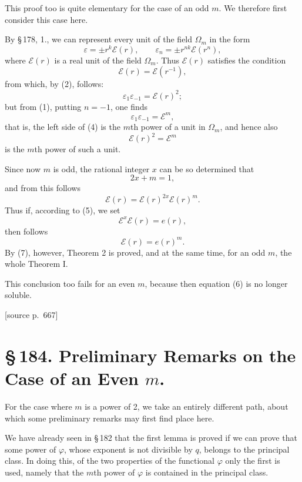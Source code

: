 \documentclass[11pt]{article}
\newcommand{\srcpage}[1]{\par\medskip\noindent\textsf{[source p.~#1]}\par\smallskip}
\begin{document}
This proof too is quite elementary for the case of an odd $m$. We therefore first consider this case here.

By \S\,178, 1., we can represent every unit of the field $\Omega_m$ in the form
\begin{equation}
\varepsilon=\pm r^k\mathscr E(r),\qquad
\varepsilon_n=\pm r^{nk}\mathscr E(r^n),
\tag{2}
\end{equation}
where $\mathscr E(r)$ is a real unit of the field $\Omega_m$. Thus $\mathscr E(r)$ satisfies the condition
\begin{equation}
\mathscr E(r)=\mathscr E(r^{-1}),
\tag{3}
\end{equation}
from which, by (2), follows:
\begin{equation}
\varepsilon_1\varepsilon_{-1}=\mathscr E(r)^2;
\tag{4}
\end{equation}
but from (1), putting $n=-1$, one finds
\[
\varepsilon_1\varepsilon_{-1}=\mathscr E^m,
\]
that is, the left side of (4) is the $m$th power of a unit in $\Omega_m$, and hence also
\begin{equation}
\mathscr E(r)^2=\mathscr E^m
\tag{5}
\end{equation}
is the $m$th power of such a unit.

Since now $m$ is odd, the rational integer $x$ can be so determined that
\begin{equation}
2x+m=1,
\tag{6}
\end{equation}
and from this follows
\[
\mathscr E(r)=\mathscr E(r)^{2x}\mathscr E(r)^m.
\]
Thus if, according to (5), we set
\[
\mathscr E^x\mathscr E(r)=e(r),
\]
then follows
\begin{equation}
\mathscr E(r)=e(r)^m.
\tag{7}
\end{equation}
By (7), however, Theorem 2 is proved, and at the same time, for an odd $m$, the whole Theorem I.

This conclusion too fails for an even $m$, because then equation (6) is no longer soluble.

\srcpage{667}
\section*{\S\,184. Preliminary Remarks on the Case of an Even $m$.}

For the case where $m$ is a power of 2, we take an entirely different path, about which some preliminary remarks may first find place here.

We have already seen in \S\,182 that the first lemma is proved if we can prove that some power of $\varphi$, whose exponent is not divisible by $q$, belongs to the principal class. In doing this, of the two properties of the functional $\varphi$ only the first is used, namely that the $m$th power of $\varphi$ is contained in the principal class.
\end{document}
